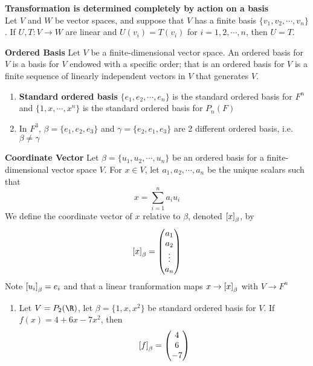 \documentclass[11pt]{article}
\begin{document}
\begin{corollary*}
    \textbf{Transformation is determined completely by action on a basis} \\
    Let $V$ and $W$ be vector spaces, and suppose that $V$ has a finite basis $\{v_1,v_2,\cdots, v_n\}$. If $U,T:V\to W$ are linear and $U(v_i) = T(v_i)$ for $i=1,2,\cdots, n$, then $U=T$.
\end{corollary*}



\begin{defn*}
    \textbf{Ordered Basis} Let $V$ be a finite-dimensional vector space. An ordered basis for $V$ is a basis for $V$ endowed with a specific order; that is an ordered basis for $V$ is a finite sequence of linearly independent vectors in $V$ that generates $V$. 
    \begin{enumerate}
        \item \textbf{Standard ordered basis} $\{e_1,e_2,\cdots, e_n\}$ is the standard ordered basis for $F^n$ and $\{1,x,\cdots, x^n\}$ is the standard ordered basis for $P_n(F)$ 
        \item In $F^3$, $\beta = \{e_1,e_2,e_3 \}$ and $\gamma = \{e_2,e_1,e_3\}$ are 2 different ordered basis, i.e. $\beta \neq \gamma$
    \end{enumerate}
\end{defn*}


\begin{defn*}
    \textbf{Coordinate Vector} Let $\beta = \{u_1,u_2,\cdots, u_n\}$ be an ordered basis for a finite-dimensional vector space $V$. For $x\in V$, let $a_1,a_2,\cdots, a_n$ be the unique scalars such that 
    \[
         x = \sum_{i=1}^n a_i u_i    
    \]
    We define the coordinate vector of $x$ relative to $\beta$, denoted $\left[ x \right]_{\beta}$, by 
    \[
        \left[ x \right]_{\beta} = 
        \begin{pmatrix}
            a_1 \\ a_2 \\  \vdots \\ a_n \\
        \end{pmatrix}
    \]
    Note $\left[ u_i \right]_{\beta} = e_i$ and that a linear tranformation maps $x\to \left[ x \right]_{\beta}$ with $V\to F^n$
    \begin{enumerate}
        \item Let $V=P_2(\R)$, let $\beta = \{1,x,x^2\}$ be standard ordered basis for $V$. If $f(x) = 4+6x-7x^2$, then 
        \[
            \left[ f \right]_{\beta} = 
            \begin{pmatrix}
                4 \\ 6 \\ -7 \\ 
            \end{pmatrix}
        \]
    \end{enumerate}
\end{defn*}
\end{document}
